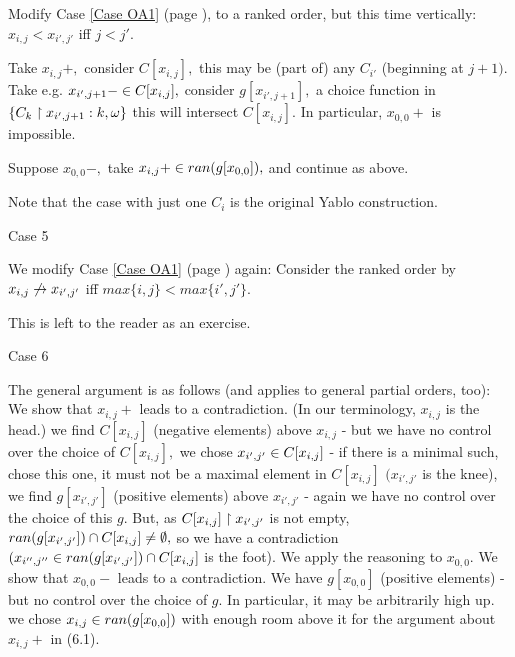 Modify
Case \ref{Case OA1} (page \pageref{Case OA1}),
to a ranked order, but this time vertically:
$x_{i,j}<x_{i',j' }$ iff $j<j'.$

Take $x_{i,j}+,$ consider $C[x_{i,j}],$ this may be (part of) any $C_{i'
}$ (beginning
at $j+1).$ Take e.g. $x_{i',j+1}- \in C[x_{i,j}],$ consider $g[x_{i'
,j+1}],$
a choice function in $\{C_{k} \upharpoonright x_{i',j+1}:k, \omega \}$
this will intersect $C[x_{i,j}].$
In particular, $x_{0,0}+$ is impossible.

Suppose $x_{0,0}-,$ take $x_{i,j}+ \in ran(g[x_{0,0}]),$ and continue as
above.

Note that the case with just one $C_{i}$ is the original Yablo
construction.

 \xDH
Case 5


\label{Case OA5}

We modify
Case \ref{Case OA1} (page \pageref{Case OA1})
again:
Consider the ranked order by $x_{i,j} \not\rightarrow x_{i',j' }$ iff
$max\{i,j\}<max\{i',j' \}.$

This is left to the reader as an exercise.

 \xDH Case 6


\label{Case OA6}

The general argument is as follows (and applies to general partial
orders, too):
 \xEh
 \xDH
We show that $x_{i,j}+$ leads to a contradiction.
(In our terminology, $x_{i,j}$ is the head.)
 \xEh
 \xDH
we find $C[x_{i,j}]$ (negative elements)
above $x_{i,j}$ - but we have no control over the choice of $C[x_{i,j}],$
 \xDH we chose $x_{i',j' } \in C[x_{i,j}]$ - if there is a minimal such,
chose this one,
it must not be a maximal element in $C[x_{i,j}]$ $(x_{i',j' }$ is the
knee),
 \xDH we find $g[x_{i',j' }]$ (positive elements)
above $x_{i',j' }$ - again we have no control over the
choice of this $g.$ But, as $C[x_{i,j}] \upharpoonright x_{i',j' }$ is not empty,
$ran(g[x_{i',j' }]) \cap C[x_{i,j}] \neq \emptyset,$ so we have a
contradiction
$(x_{i'',j'' } \in ran(g[x_{i',j' }]) \cap C[x_{i,j}]$ is the foot).
 \xDH
We apply the reasoning to $x_{0,0}.$
 \xEj
 \xDH
We show that $x_{0,0}-$ leads to a contradiction.
 \xEh
 \xDH We have $g[x_{0,0}]$ (positive elements) -
but no control over the choice of $g.$ In particular,
it may be arbitrarily high up.
 \xDH we chose $x_{i,j} \in ran(g[x_{0,0}])$ with enough room above it
for the
argument about $x_{i,j}+$ in (6.1).
 \xEj

